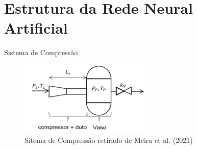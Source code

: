 \section{Estrutura da Rede Neural Artificial}

\begin{frame}{Sistema de Compressão}

\begin{figure}
    \centering
    \includegraphics[width=0.6\linewidth]{figures/compressao.png}
    \caption{Sitema de Compressão retirado de Meira et al. (2021)}
    \label{fig:enter-label}
\end{figure}


\end{frame}
